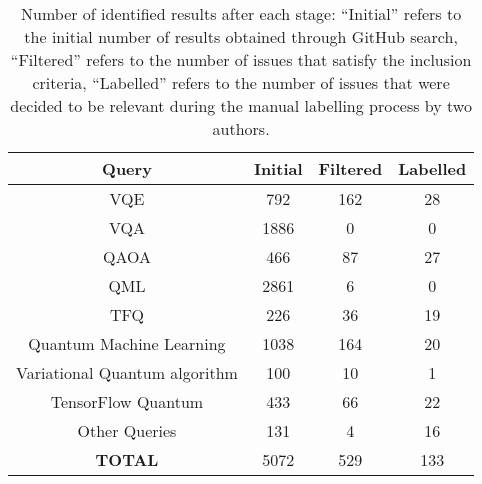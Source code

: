 \begin{table}[hbt!]
    \centering      
    \caption{Number of identified results after each stage: ``Initial'' refers to the initial number of results obtained through GitHub search, ``Filtered'' refers to the number of issues that satisfy the inclusion criteria, ``Labelled'' refers to the number of issues that were decided to be relevant during the manual labelling process by two authors.}
 
    \begin{tabular}{c|c|c|c}
        \hline
        \textbf{Query} & \textbf{Initial} & \textbf{Filtered} & \textbf{Labelled} \\
        \hline
        VQE & 792 & 162 & 28  \\
        \hline
        VQA & 1886 & 0  & 0  \\
        \hline
        QAOA & 466 & 87  & 27 \\
        \hline
        QML & 2861  & 6  & 0   \\
        \hline
        TFQ & 226 & 36 & 19  \\
        \hline
        Quantum Machine Learning  & 1038 & 164 & 20 \\
        \hline
        Variational Quantum algorithm & 100 & 10 & 1  \\
        \hline
        TensorFlow Quantum&  433 & 66 & 22  \\
        \hline
        Other Queries & 131 & 4 & 16  \\
        \hline
        \textbf{TOTAL}& 5072 & 529 & 133  \\
        
    \end{tabular}
    \label{tab:searchoverview}
\end{table}

 

